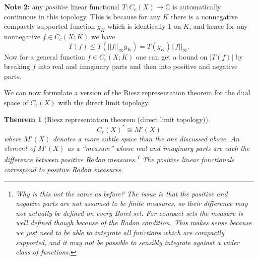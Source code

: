 \documentclass[a4paper,11pt,twoside]{amsart}
\let\vec\mathbf
\newcommand{\C}{\mathbb{C}}
\newcommand{\R}{\mathbb{R}}
\newtheorem*{theorem}{Theorem}
\theoremstyle{definition}
\begin{document}
\textbf{Note 2:} any \emph{positive} linear functional $T \colon C_c(X) \to \C$ is automatically continuous in this topology. This is because for any $K$ there is a nonnegative compactly supported function $g_K$ which is identically 1 on $K$, and hence for any nonnegative $f \in C_c(X;K)$ we have
\[
T(f) \leq T(||f||_\infty g_K) = T(g_K) ||f||_\infty.
\]
Now for a general function $f \in C_c(X;K)$ one can get a bound on $|T(f)|$ by breaking $f$ into real and imaginary parts and then into positive and negative parts.

We can now formulate a version of the Riesz representation theorem for the dual space of $C_c(X)$ with the direct limit topology.

\begin{theorem}[Riesz representation theorem (direct limit topology)]
\[
C_c(X)^* \cong M'(X)
\]
where $M'(X)$ denotes a more subtle space than the one discussed above. An element of $M'(X)$ as a ``measure'' whose real and imaginary parts are each the difference between positive Radon measures.\footnote{Why is this not the same as before? The issue is that the positive and negative parts are not assumed to be finite measures, so their difference may not actually be defined on every Borel set. For compact sets the measure is well defined though because of the Radon condition. This makes sense because we just need to be able to integrate all functions which are compactly supported, and it may not be possible to sensibly integrate against a wider class of functions.}  The positive linear functionals correspond to positive Radon measures.
\end{theorem}


\end{document}
